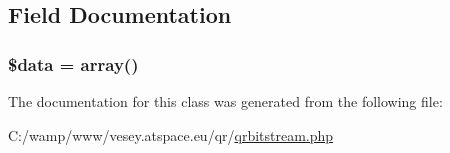 \subsection{Field Documentation}
\hypertarget{class_q_rbitstream_a6efc15b5a2314dd4b5aaa556a375c6d6}{
\subsubsection[{\$data}]{\setlength{\rightskip}{0pt plus 5cm}\$data = array()}}\label{class_q_rbitstream_a6efc15b5a2314dd4b5aaa556a375c6d6}


The documentation for this class was generated from the following file\-:\begin{DoxyCompactItemize}
\item 
C\-:/wamp/www/vesey.\-atspace.\-eu/qr/\hyperlink{qrbitstream_8php}{qrbitstream.\-php}\end{DoxyCompactItemize}
